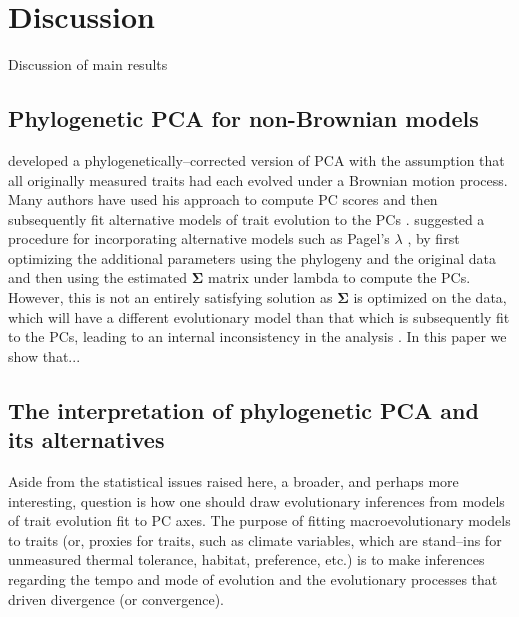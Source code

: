 \documentclass[a4paper,12pt]{article}
\begin{document}
\section{Discussion}

Discussion of main results

\subsection{Phylogenetic PCA for non-Brownian models}
\citet{Revell2008} developed a phylogenetically--corrected version of PCA with the assumption that all originally measured traits had each evolved under a Brownian motion process. Many authors have used his approach to compute PC scores and then subsequently fit alternative models of trait evolution to the PCs \citep{somethings}. \citet{Revell2008} suggested a procedure for incorporating alternative models such as Pagel's $\lambda$ \citep{Pagel1999}, by first optimizing the additional parameters using the phylogeny and the original data \citep[e.g., following the method of][]{Freckleton2002} and then using the estimated $\mathbf{\Sigma}$ matrix under lambda to compute the PCs. However, this is not an entirely satisfying solution as $\mathbf{\Sigma}$ is optimized on the data, which will have a different evolutionary model than that which is subsequently fit to the PCs, leading to an internal inconsistency in the analysis \citep[as pointed out by][this may lead to different estimates of the same parameter at different steps in the analysis]{Revell2008}. In this paper we show that...

\subsection{The interpretation of phylogenetic PCA and its alternatives}
Aside from the statistical issues raised here, a broader, and perhaps more interesting, question is how one should draw evolutionary inferences from models of trait evolution fit to PC axes. The purpose of fitting macroevolutionary models to traits (or, proxies for traits, such as climate variables, which are stand--ins for unmeasured thermal tolerance, habitat, preference, etc.) is to make inferences regarding the tempo and mode of evolution and the evolutionary processes that driven divergence (or convergence). 
\end{document}
